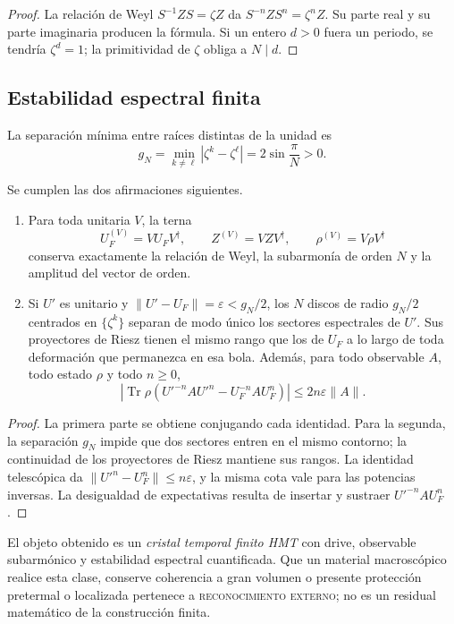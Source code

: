 \begin{proof}
La relación de Weyl \(S^{-1} Z S=\zeta Z\) da
\(S^{-n} Z S^n=\zeta^n Z\). Su parte real y su parte imaginaria producen la
fórmula. Si un entero \(d>0\) fuera un periodo, se tendría
\(\zeta^d=1\); la primitividad de \(\zeta\) obliga a \(N\mid d\).
\end{proof}

\subsection{Estabilidad espectral finita}

La separación mínima entre raíces distintas de la unidad es
\[
 g_N=\min_{k\ne\ell}|\zeta^k-\zeta^\ell|
 =2\sin\frac{\pi}{N}>0.
\]

\begin{theorem}
\label{thm:hmtf2-estabilidad-cristal}
Se cumplen las dos afirmaciones siguientes.

\begin{enumerate}
 \item Para toda unitaria \(V\), la terna
 \[
  U_F^{(V)}=V U_F V^\dagger,\qquad
  Z^{(V)}=V Z V^\dagger,\qquad
  \rho^{(V)}=V\rho V^\dagger
 \]
 conserva exactamente la relación de Weyl, la subarmonía de orden \(N\) y
 la amplitud del vector de orden.
 \item Si \(U'\) es unitario y
 \(\|U'-U_F\|=\varepsilon<g_N/2\), los \(N\) discos de radio
 \(g_N/2\) centrados en \(\{\zeta^k\}\) separan de modo único los sectores
 espectrales de \(U'\). Sus proyectores de Riesz tienen el mismo rango que
 los de \(U_F\) a lo largo de toda deformación que permanezca en esa bola.
 Además, para todo observable \(A\), todo estado \(\rho\) y todo \(n\geq0\),
 \[
 \left|
 \operatorname{Tr}\rho\left(U'^{-n}AU'^n-U_F^{-n}AU_F^n\right)
 \right|
 \leq 2n\varepsilon\|A\|.
 \]
\end{enumerate}
\end{theorem}

\begin{proof}
La primera parte se obtiene conjugando cada identidad. Para la segunda, la
separación \(g_N\) impide que dos sectores entren en el mismo contorno; la
continuidad de los proyectores de Riesz mantiene sus rangos. La identidad
telescópica da
\(\|U'^n-U_F^n\|\leq n\varepsilon\), y la misma cota vale para las
potencias inversas. La desigualdad de expectativas resulta de insertar y
sustraer \(U'^{-n}AU_F^n\).
\end{proof}

El objeto obtenido es un \emph{cristal temporal finito HMT} con drive,
observable subarmónico y estabilidad espectral cuantificada. Que un material
macroscópico realice esta clase, conserve coherencia a gran volumen o
presente protección pretermal o localizada pertenece a
\textsc{reconocimiento externo}; no es un residual matemático de la
construcción finita.


